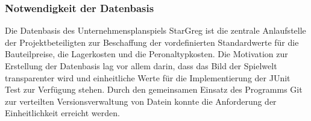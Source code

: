 \subsubsection{Notwendigkeit der Datenbasis}
\label{subsub:spielwelt-datenbasis-einleitung-notwendigkeit}

Die Datenbasis des Unternehmensplanspiels StarGreg ist die zentrale Anlaufstelle der Projektbeteiligten zur Beschaffung der vordefinierten Standardwerte für die Bauteilpreise, die Lagerkosten und die Peronaltypkosten. Die Motivation zur Erstellung der Datenbasis lag vor allem darin, dass das Bild der Spielwelt transparenter wird und einheitliche Werte für die Implementierung der JUnit Test zur Verfügung stehen. Durch den gemeinsamen Einsatz des Programms Git zur verteilten Versionsverwaltung von Datein konnte die Anforderung der Einheitlichkeit erreicht werden. 
